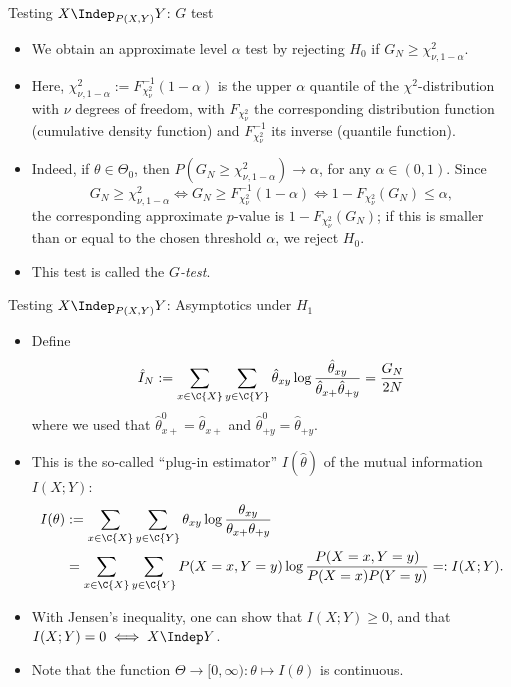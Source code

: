 \begin{frame}{Testing $X \Indep_{P(X,Y)} Y$: $G$ test}
  \begin{itemize}
    \item We obtain an approximate level $\alpha$ test by rejecting $H_0$ if $G_N \ge \chi_{\nu,1-\alpha}^2$. 
    \item Here, $\chi^2_{\nu,1-\alpha} := F_{\chi^2_\nu}^{-1}(1-\alpha)$ is the upper $\alpha$ quantile of the $\chi^2$-distribution with $\nu$ degrees of freedom, with $F_{\chi^2_\nu}$ the corresponding distribution function (cumulative density function) and $F^{-1}_{\chi^2_\nu}$ its inverse (quantile function).
    \item Indeed, if $\theta \in \Theta_0$, then $P(G_N \ge \chi_{\nu,1-\alpha}^2) \to \alpha$, for any $\alpha \in (0,1)$.
Since 
$$G_N \ge \chi_{\nu,1-\alpha}^2 \iff G_N \ge F_{\chi^2_\nu}^{-1}(1-\alpha) \iff 1-F_{\chi^2_\nu}(G_N) \le \alpha,$$
the corresponding approximate $p$-value is $1 - F_{\chi^2_\nu}(G_N)$; if this is smaller than or equal to the chosen threshold $\alpha$, we reject $H_0$.
\item This test is called the \emph{$G$-test}.
  \end{itemize}
\end{frame}

\begin{frame}{Testing $X \Indep_{P(X,Y)} Y$: Asymptotics under $H_1$}
  \begin{itemize}
    \item Define
$$\hat I_N := \sum_{x\in\C{X}} \sum_{y\in\C{Y}} \hat \theta_{xy} \log \frac{\hat \theta_{xy}}{\hat \theta_{x+} \hat \theta_{+ y}}
    = \frac{G_N}{2N}$$
where we used that $\hat\theta^0_{x +} = \hat\theta_{x +}$ and $\hat\theta^0_{+ y} = \hat\theta_{+ y}$.
\item This is the so-called ``plug-in estimator'' $I(\hat\theta)$ of the mutual information $I(X;Y)$:
\begin{equation*}\begin{split}
  I(\theta) & := \sum_{x\in\C{X}}\sum_{y\in\C{Y}} \theta_{xy} \log \frac{\theta_{xy}}{\theta_{x +} \theta_{+ y}} \\
  & = \sum_{x\in\C{X}} \sum_{y\in\C{Y}} P(X=x,Y=y) \log \frac{P(X=x,Y=y)}{P(X=x) P(Y=y)} =: I(X;Y).
\end{split}\end{equation*}
\item With Jensen's inequality, one can show that $I(X;Y) \ge 0$, and that $I(X;Y) = 0 \iff X \Indep Y$.
\item Note that the function $\Theta \to [0,\infty) : \theta \mapsto I(\theta)$ is continuous.
  \end{itemize}
\end{frame}

